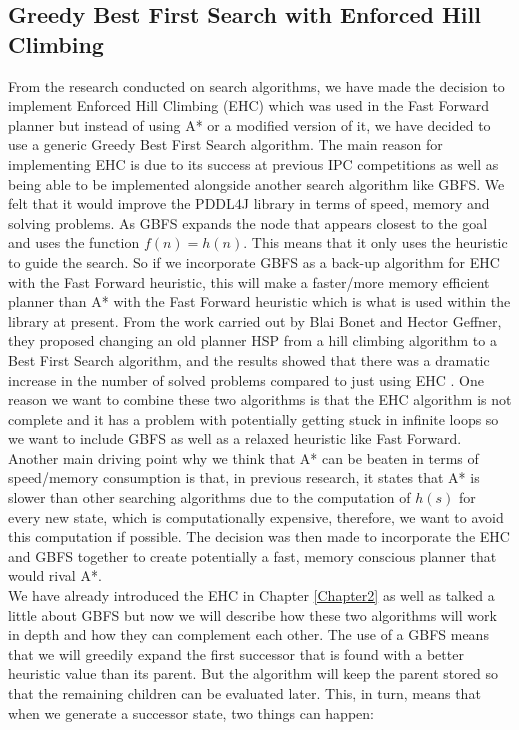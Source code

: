 \subsection{Greedy Best First Search with Enforced Hill Climbing}
From the research conducted on search algorithms, we have made the decision to implement Enforced Hill Climbing (EHC) which was used in the Fast Forward planner \cite{FFPlanner} but instead of using A* or a modified version of it, we have decided to use a generic Greedy Best First Search algorithm\cite{AModernApproach}. The main reason for implementing EHC is due to its success at previous IPC competitions as well as being able to be implemented alongside another search algorithm like GBFS. We felt that it would improve the PDDL4J library in terms of speed, memory and solving problems.
As GBFS expands the node that appears closest to the goal and uses the function $f(n) = h(n)$. This means that it only uses the heuristic to guide the search. So if we incorporate GBFS as a back-up algorithm for EHC with the Fast Forward heuristic, this will make a faster/more memory efficient planner than A* with the Fast Forward heuristic which is what is used within the library at present. 
From the work carried out by Blai Bonet and Hector Geffner, they proposed changing an old planner HSP \cite{HeuristicNewResults} from a hill climbing algorithm to a Best First Search algorithm, and the results showed that there was a dramatic increase in the number of solved problems compared to just using EHC \cite{PlanningHeuristic}. One reason we want to combine these two algorithms is that the EHC algorithm is not complete and it has a problem with potentially getting stuck in infinite loops so we want to include GBFS as well as a relaxed heuristic like Fast Forward. 
Another main driving point why we think that A* can be beaten in terms of speed/memory consumption is that, in previous research, it states that A* is slower than other searching algorithms due to the computation of $h(s)$ for every new state, which is computationally expensive\cite{HeuristicNewResults}, therefore, we want to avoid this computation if possible. The decision was then made to incorporate the EHC and GBFS together to create potentially a fast, memory conscious planner that would rival A*.  
\\
We have already introduced the EHC in Chapter \ref{Chapter2} as well as talked a little about GBFS but now we will describe how these two algorithms will work in depth and how they can complement each other. 
The use of a GBFS means that we will greedily expand the first successor that is found with a better heuristic value than its parent. But the algorithm will keep the parent stored so that the remaining children can be evaluated later. This, in turn, means that when we generate a successor state, two things can happen: 
